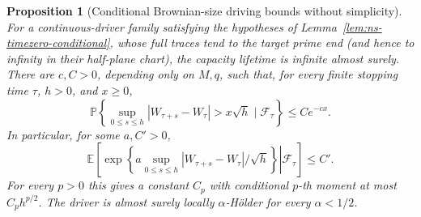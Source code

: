 \documentclass[11pt]{article}
\newtheorem{proposition}[theorem]{Proposition}
\theoremstyle{definition}\newtheorem{definition}[theorem]{Definition}
\theoremstyle{remark}\newtheorem{remark}[theorem]{Remark}
\begin{document}
\begin{proposition}[Conditional Brownian-size driving bounds without simplicity]
\label{prop:ns-driver-exponential}
For a continuous-driver family satisfying the hypotheses of
Lemma~\ref{lem:ns-timezero-conditional}, whose full traces tend to the
target prime end (and hence to infinity in their half-plane chart),
the capacity lifetime is infinite almost surely. There are $c,C>0$, depending
only on $M,q$, such that, for every finite stopping time $\tau$,
$h>0$, and $x\ge0$,
\[
 \mathbb P\left\{\sup_{0\le s\le h}|W_{\tau+s}-W_\tau|
                         >x\sqrt h\mid\mathcal F_\tau\right\}
      \le Ce^{-cx}.
 \tag{NS4}
\]
In particular, for some $a,C'>0$,
\[
 \mathbb E\left[\left.
   \exp\left\{a\sup_{0\le s\le h}
       |W_{\tau+s}-W_\tau|/\sqrt h\right\}
                    \right|\mathcal F_\tau\right]\le C'.
 \tag{NS5}
\]
For every $p>0$ this gives a constant $C_p$ with conditional
$p$-th moment at most $C_ph^{p/2}$. The driver is almost surely
locally $\alpha$-H\"older for every $\alpha<1/2$.
\end{proposition}
\end{document}
